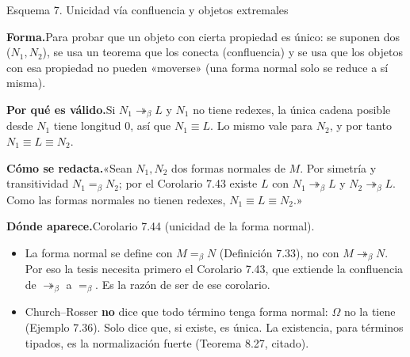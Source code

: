 \documentclass[11pt,a4paper]{article}
\newcommand{\forma}{\par\noindent\textbf{Forma.}\enspace}
\newcommand{\porque}{\par\smallskip\noindent\textbf{Por qué es válido.}\enspace}
\newcommand{\plantilla}{\par\smallskip\noindent\textbf{Cómo se redacta.}\enspace}
\newcommand{\donde}{\par\smallskip\noindent\textbf{Dónde aparece.}\enspace}
\newcommand{\bmred}{\twoheadrightarrow_\beta}
\newcommand{\beq}{=_\beta}
\begin{document}
\begin{esquema}{Esquema 7. Unicidad vía confluencia y objetos extremales}
\forma Para probar que un objeto con cierta propiedad es único: se suponen dos
(\(N_1,N_2\)), se usa un teorema que los conecta (confluencia) y se usa que
los objetos con esa propiedad no pueden «moverse» (una forma normal solo se
reduce a sí misma).

\porque Si \(N_1\bmred L\) y \(N_1\) no tiene redexes, la única cadena posible
desde \(N_1\) tiene longitud \(0\), así que \(N_1\equiv L\). Lo mismo vale
para \(N_2\), y por tanto \(N_1\equiv L\equiv N_2\).

\plantilla «Sean \(N_1,N_2\) dos formas normales de \(M\). Por simetría y
transitividad \(N_1\beq N_2\); por el Corolario 7.43 existe \(L\) con
\(N_1\bmred L\) y \(N_2\bmred L\). Como las formas normales no tienen redexes,
\(N_1\equiv L\equiv N_2\).»

\donde Corolario 7.44 (unicidad de la forma normal).
\end{esquema}

\begin{trampa}
\begin{itemize}
  \item La forma normal se define con \(M\beq N\) (Definición 7.33), no con
    \(M\bmred N\). Por eso la tesis necesita primero el Corolario 7.43, que
    extiende la confluencia de \(\bmred\) a \(\beq\). Es la razón de ser de
    ese corolario.
  \item Church--Rosser \textbf{no} dice que todo término tenga forma normal:
    \(\Omega\) no la tiene (Ejemplo 7.36). Solo dice que, si existe, es
    única. La existencia, para términos tipados, es la normalización fuerte
    (Teorema 8.27, citado).
\end{itemize}
\end{trampa}
\end{document}
